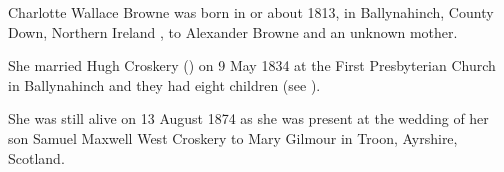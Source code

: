 
Charlotte Wallace Browne was born in or about 1813, in Ballynahinch, County Down, Northern Ireland \cite{CharlotteWBrowneBirth}, to Alexander Browne and an unknown mother.

She married Hugh Croskery () on 9 May 1834 at the First Presbyterian Church in Ballynahinch and they had eight children (see ).

She was still alive on 13 August 1874 as she was present at the wedding of her son Samuel Maxwell West Croskery to Mary Gilmour in Troon, Ayrshire, Scotland. \cite{SMWCmarriage}
